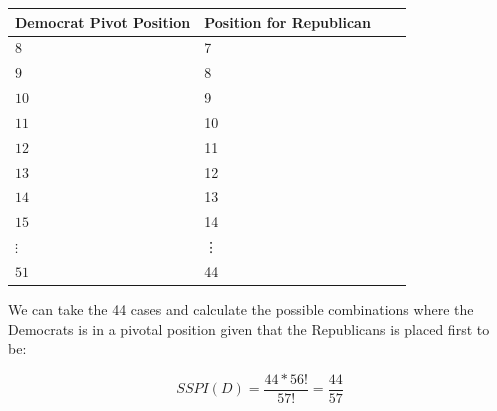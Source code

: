 \documentclass[12pt]{article}
\begin{document}
\begin{center}
\begin{tabular}{ | l | l | l | p{5cm} |}
    \hline
    Democrat Pivot Position & Position for Republican \\ \hline
    $8$ & 7 \\ \hline
    $9$ & 8  \\ \hline
    $10$ & 9  \\ \hline
    $11$ & 10 \\ \hline
    $12$ & 11  \\ \hline
    $13$ & 12  \\ \hline
    $14$ & 13 \\ \hline
    $15$ & 14  \\ \hline
    $\vdots$&\vdots \\ \hline
    $51$ & 44  \\ \hline
    \end{tabular}
\end{center}
We can take the 44 cases and calculate the possible combinations where the Democrats is in a pivotal position given that the Republicans is placed first to be:


$$SSPI(D) = \frac{44 * 56!}{57!} = \frac{44}{57}$$
\end{document}
